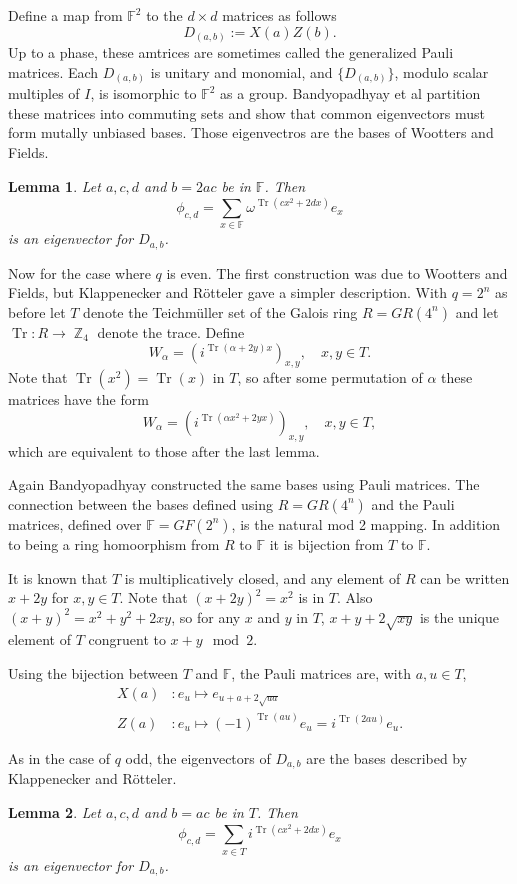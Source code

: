 \documentclass[a4paper]{article}
\DeclareMathOperator{\Z}{\mathbb{Z}}
\DeclareMathOperator{\Tr}{Tr}
\newtheorem{lemma}{Lemma}
\begin{document}
  Define a map from $\mathbb{F}^2$ to the $d \times d$ 
  matrices as follows
  \[
    D_{(a,b)} 
    := X(a) Z(b).
  \] 
  Up to a phase, these amtrices are sometimes called the
  generalized Pauli matrices. Each $D_{(a,b)}$ is unitary
  and monomial, and $\{D_{(a,b)}\}$, modulo scalar multiples
  of $I$, is isomorphic to $\mathbb{F}^2$ as a group.
  Bandyopadhyay et al partition these matrices into
  commuting sets and show that common eigenvectors must form
  mutally unbiased bases. Those eigenvectros are the bases
  of Wootters and Fields.

  \begin{lemma}
    Let $a,c,d$ and $b = 2ac$ be in $\mathbb{F}$. Then
    \[
      \phi_{c,d}
      = \sum_{x \in \mathbb{F}}^{} \omega^{\Tr(cx^2+2dx)}e_x
    \] 
    is an eigenvector for $D_{a,b}$.
  \end{lemma}

  Now for the case where $q$ is even. The first construction
  was due to Wootters and Fields, but Klappenecker and
  Rötteler gave a simpler description. With $q = 2^{n}$ as
  before let $T$ denote the Teichmüller set of the Galois
  ring $R = GR(4^{n})$ and let $\Tr : R \to \Z_4$ denote the
  trace. Define
  \[
    W_\alpha = \left( i^{\Tr(\alpha+2y)x} \right)_{x,y},
    \quad x,y \in T.
  \] 
  Note that $\Tr(x^2) = \Tr(x)$ in $T$, so after some
  permutation of $\alpha$ these matrices have the form
  \[
    W_\alpha = \left( i^{\Tr(\alpha x^2 +2yx)}
    \right)_{x,y},
    \quad x,y \in T,
  \] 
  which are equivalent to those after the last lemma.

  Again Bandyopadhyay constructed the same bases using Pauli
  matrices. The connection between the bases defined using
  $R = GR(4^{n})$ and the Pauli matrices, defined over
  $\mathbb{F} = GF(2^{n})$, is the natural mod 2 mapping. In
  addition to being a ring homoorphism from $R$ to
  $\mathbb{F}$ it is bijection from $T$ to $\mathbb{F}$.

  It is known that $T$ is multiplicatively closed, and any
  element of $R$ can be written $x+2y$ for $x,y \in T$. Note
  that $(x+2y)^2 = x^2$ is in $T$. Also $(x+y)^2 =
  x^2+y^2+2xy$, so for any $x$ and $y$ in $T$, $x+y+2
  \sqrt{xy}$ is the unique element of $T$ congruent to $x+y
  \mod 2$.

  Using the bijection between $T$ and $\mathbb{F}$, the
  Pauli matrices are, with $a,u \in T$,
  \begin{align*}
    X(a) &: e_u \mapsto e_{u+a+2 \sqrt{ua}} \\
    Z(a) &: e_u \mapsto (-1)^{\Tr(au)} e_u = i^{\Tr(2au)}
    e_u
  .\end{align*} 

  As in the case of $q$ odd, the eigenvectors of $D_{a,b}$ 
  are the bases described by Klappenecker and Rötteler.

  \begin{lemma}
    Let $a,c,d$ and $b = ac$ be in $T$. Then
    \[
      \phi_{c,d} = 
      \sum_{x \in T}^{} i^{\Tr(cx^2+2dx)} e_x
    \] 
    is an eigenvector for $D_{a,b}$.
  \end{lemma}
\end{document}
